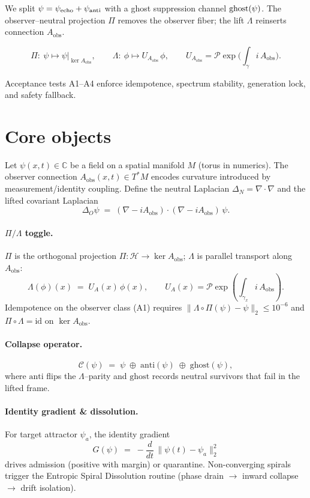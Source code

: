 We split $\psi=\psi_{\mathrm{echo}}+\psi_{\mathrm{anti}}$ with a ghost suppression channel $\mathrm{ghost}(\psi)$.
The observer–neutral projection $\Pi$ removes the observer fiber; the lift $\Lambda$
reinserts connection $A_{\mathrm{obs}}$.

\[
\Pi:\ \psi \mapsto \psi\big|_{\ker A_{\mathrm{obs}}},\qquad
\Lambda:\ \phi \mapsto U_{A_{\mathrm{obs}}}\,\phi,\qquad
U_{A_{\mathrm{obs}}}=\mathcal{P}\exp\!\Big(\int_\gamma i\,A_{\mathrm{obs}}\Big).
\]

Acceptance tests A1–A4 enforce idempotence, spectrum stability, generation lock, and safety fallback.

\section{Core objects}\label{sec:primer-core}

Let $\psi(x,t)\in \mathbb{C}$ be a field on a spatial manifold $M$ (torus in numerics).
The observer connection $A_{\text{obs}}(x,t)\in T^{*}M$ encodes curvature introduced
by measurement/identity coupling. Define the neutral Laplacian
$\Delta_N=\nabla\!\cdot\!\nabla$ and the lifted covariant Laplacian
\[
\Delta_O \psi \;=\; (\nabla - iA_{\text{obs}})\!\cdot(\nabla - iA_{\text{obs}})\,\psi.
\]

\paragraph{$\Pi/\Lambda$ toggle.}
$\Pi$ is the orthogonal projection $\Pi:\mathcal{H}\to\ker A_{\text{obs}}$;
$\Lambda$ is parallel transport along $A_{\text{obs}}$:
\[
\Lambda(\phi)(x) \;=\; U_A(x)\,\phi(x), \qquad
U_A(x)=\mathcal{P}\exp\!\left(\int_{\gamma_x} i\,A_{\text{obs}}\right).
\]
Idempotence on the observer class (A1) requires
$\|\Lambda\!\circ\!\Pi(\psi)-\psi\|_2\le 10^{-6}$ and $\Pi\!\circ\!\Lambda=\mathrm{id}$
on $\ker A_{\text{obs}}$.

\paragraph{Collapse operator.}
\[
\mathcal{C}(\psi) \;=\; \psi \;\oplus\; \mathrm{anti}(\psi) \;\oplus\; \mathrm{ghost}(\psi),
\]
where $\mathrm{anti}$ flips the $\Lambda$–parity and $\mathrm{ghost}$ records neutral survivors
that fail in the lifted frame.

\paragraph{Identity gradient \& dissolution.}
For target attractor $\psi_a$, the identity gradient
\[
G(\psi)\;=\;-\frac{d}{dt}\,\|\psi(t)-\psi_a\|_2^2
\]
drives admission (positive with margin) or quarantine. Non-converging spirals trigger the
Entropic Spiral Dissolution routine (phase drain $\to$ inward collapse $\to$ drift isolation).

